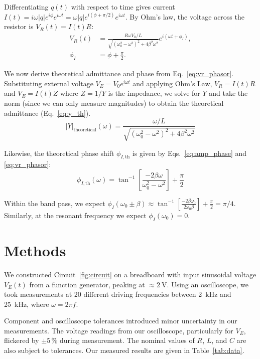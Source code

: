 \documentclass[11pt,twocolumn]{article}
\begin{document}
Differentiating $q(t)$ with respect to time gives current $I(t) = i\omega |q| e^{i\phi} e^{i\omega t} = \omega |q| e^{i(\phi+\pi/2)} e^{i\omega t}$. By Ohm's law, the voltage across the resistor is $V_R(t) = I(t) R$:
\begin{equation}
  \label{eq:vr_phasor}
  \begin{aligned}
    V_R(t) & = \frac{R\omega V_0/L}{\sqrt{(\omega_0^2 - \omega^2)^2 + 4\beta^2\omega^2}} e^{i(\omega t + \phi_I)}, \\
    \phi_I & = \phi + \frac{\pi}{2}.
  \end{aligned}
\end{equation}

We now derive theoretical admittance and phase from Eq.~\eqref{eq:vr_phasor}. Substituting external voltage $V_E = V_0 e^{i\omega t}$ and applying Ohm's Law, $V_R = I(t) R$ and $V_E = I(t) Z$ where $Z = 1/Y$ is the impedance, we solve for $Y$ and take the norm (since we can only measure magnitudes) to obtain the theoretical admittance (Eq.~\eqref{eq:y_th}).
\begin{equation}
  \label{eq:y_th}
  |Y|_{\mathrm{theoretical}}(\omega) = \frac{\omega/L}{\sqrt{(\omega_0^2 - \omega^2)^2 + 4\beta^2\omega^2}}
\end{equation}

Likewise, the theoretical phase shift $\phi_{I,\mathrm{th}}$ is given by Eqs.~\eqref{eq:amp_phase} and \eqref{eq:vr_phasor}:
\begin{equation}
  \label{eq:phi_th}
  \phi_{I,\mathrm{th}}(\omega) = \tan^{-1}\left[\frac{-2\beta\omega}{\omega_0^2 - \omega^2}\right] + \frac{\pi}{2}
\end{equation}

Within the band pass, we expect $\phi_I(\omega_0 \pm \beta) \approx \tan^{-1}\left[\frac{-2\beta\omega_0}{2\omega_0\beta}\right] + \frac{\pi}{2} = \pi/4$. Similarly, at the resonant frequency we expect $\phi_I(\omega_0) = 0$.

\section{Methods}\label{sec:methods}
We constructed Circuit~\ref{fig:circuit} on a breadboard with input sinusoidal voltage $V_E(t)$ from a function generator, peaking at $\approx \qty{2}{\V}$. Using an oscilloscope, we took measurements at 20 different driving frequencies between \qty{2}{\kilo\hertz} and \qty{25}{\kilo\hertz}, where $\omega = 2\pi f$.

Component and oscilloscope tolerances introduced minor uncertainty in our measurements. The voltage readings from our oscilloscope, particularly for $V_E$, flickered by $\pm 5\,\%$ during measurement. The nominal values of $R$, $L$, and $C$ are also subject to tolerances. Our measured results are given in Table~\ref{tab:data}.
\end{document}
